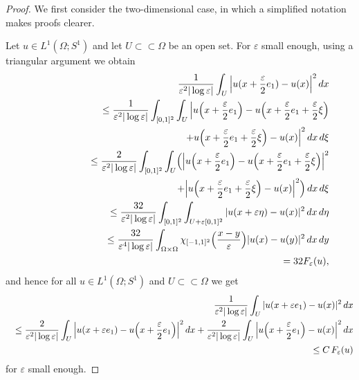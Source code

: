 \documentclass[11pt]{article}
\def\e{\varepsilon}
\def\dx{\,dx}
\begin{document}
\begin{proof}  
We first consider the two-dimensional case, in which a simplified notation makes proofs clearer. 

Let $u\in L^1(\Omega; S^1)$ and let $U\subset\subset\Omega$ be an open set. 
For $\e$ small enough, using a triangular argument we obtain 
\begin{eqnarray*}
&& \hskip-5mm{1\over\e^2|\log\e|}\int_{U} \Big|u(x+\frac{\e}{2} e_1)-u(x)\Big|^2\dx
\\
&&\le {1\over\e^2|\log\e|}\int_{[0,1]^2}\int_{U} \Big|u\Big(x+\frac{\e}{2} e_1\Big)-u\Big(x+\frac{\e}{2} e_1+\frac{\e}{2}\xi\Big)\\
&&\hskip5cm+u\Big(x+\frac{\e}{2} e_1+\frac{\e}{2}\xi\Big)-u(x)\Big|^2\dx\, d\xi\\
&&\le {2\over\e^2|\log\e|}\int_{[0,1]^2}\int_{U}\Bigl( \Big|u\Big(x+\frac{\e}{2} e_1\Big)-u\Big(x+\frac{\e}{2} e_1+\frac{\e}{2}\xi\Big)\Big|^2\\
&&\hskip5cm+\Big|u\Big(x+\frac{\e}{2} e_1+\frac{\e}{2} \xi\Big)-u(x)\Big|^2\Bigr)
\dx\, d\xi
\\
&&\le {32\over\e^2|\log\e|}\int_{[0,1]^2}\int_{U+\e [0,1]^2} |u(x+\e\eta)-u(x)|^2\dx\, d\eta\\
&&\le 
{32\over\e^4|\log\e|} \int_{\Omega\times\Omega}\chi_{[-1,1]^2}\Big(\frac{x-y}{\e}\Big) |u(x)-u(y)|^2\dx\, dy\\
&&= 
32 F_\e(u),
\end{eqnarray*} 
and hence for all $u\in L^1(\Omega; S^1)$ and $U\subset\subset \Omega$ we get 
\begin{eqnarray}\label{e1}
&&\hspace{-5mm}{1\over\e^2|\log\e|}\int_{U} |u(x+\e e_1)-u(x)|^2\dx\nonumber \\
&&\leq 
{2\over\e^2|\log\e|}\int_{U} \Big|u(x+\e e_1)-u\Big(x+\frac{\e}{2} e_1\Big)\Big|^2\dx+
{2\over\e^2|\log\e|}\int_{U} \Big|u\Big(x+\frac{\e}{2} e_1\Big)-u(x)\Big|^2\dx\nonumber \\
&&\leq C\, F_\e(u)
\end{eqnarray} 
for $\e$ small enough. 



\end{proof}
\end{document}
